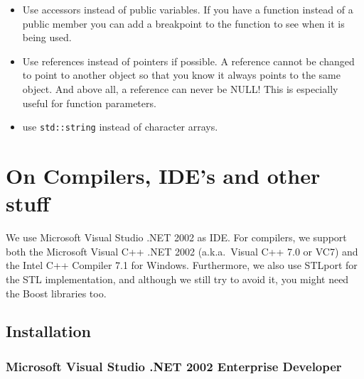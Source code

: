 \documentclass[10pt,a4paper,titlepage,dutch]{report}
\begin{document}
\begin{itemize}
\item Use accessors instead of public variables. If you have a function
instead of a public member you can add a breakpoint to the
function to see when it is being used.

\item Use references instead of pointers if possible. A reference cannot
be changed to point to another object so that you know it always
points to the same object. And above all, a reference can never be
NULL! This is especially useful for function parameters.

\item use \verb|std::string| instead of character arrays.

\end{itemize}


\chapter{On Compilers, IDE's and other stuff}

We use Microsoft Visual Studio .NET 2002 as IDE.  For compilers,
we support both the Microsoft Visual C++ .NET 2002 (a.k.a.~Visual
C++ 7.0 or VC7) and the Intel C++ Compiler 7.1 for Windows.
Furthermore, we also use STLport for the STL implementation, and
although we still try to avoid it, you might need the Boost
libraries too.

\section{Installation}

\subsection{Microsoft Visual Studio .NET 2002 Enterprise Developer}
\end{document}
